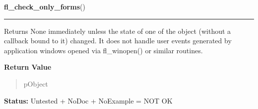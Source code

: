     \label{xformslib:library:fl_check_only_forms}

    \vspace{0.5ex}

\hspace{.8\funcindent}\begin{boxedminipage}{\funcwidth}

    \raggedright \textbf{fl\_check\_only\_forms}()

    \vspace{-1.5ex}

    \rule{\textwidth}{0.5\fboxrule}
\setlength{\parskip}{2ex}
    Returns None immediately unless the state of one of the object (without
    a callback bound to it) changed. It does not handle user events 
    generated by application windows opened via fl\_winopen() or similar 
    routines.

\setlength{\parskip}{1ex}
      \textbf{Return Value}
    \vspace{-1ex}

      \begin{quote}
      pObject

      \end{quote}

\textbf{Status:} Untested + NoDoc + NoExample = NOT OK



    \end{boxedminipage}

    \label{xformslib:library:fl_freeze_form}

    \vspace{0.5ex}


